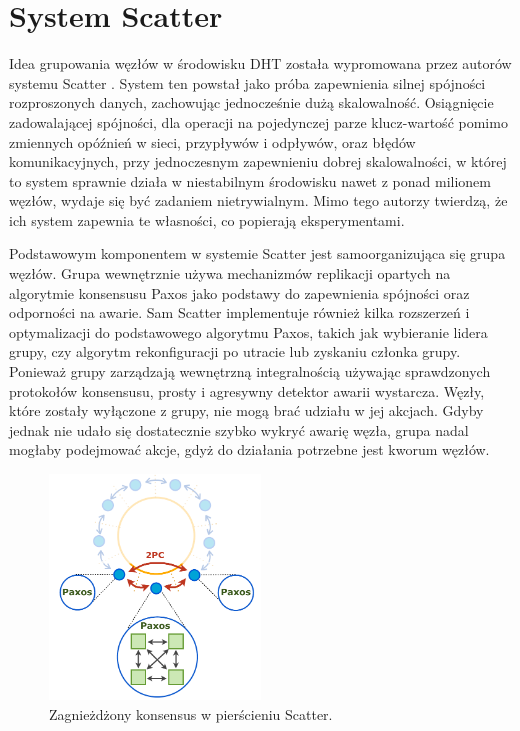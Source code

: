 \documentclass[12pt, twoside, openany]{report}
\begin{document}
\section{System Scatter}
\label{subch_scatter}
Idea grupowania węzłów w środowisku DHT została wypromowana przez autorów systemu Scatter \cite{bib:scatter}. System ten powstał jako próba zapewnienia silnej spójności rozproszonych danych,
zachowując jednocześnie dużą skalowalność. Osiągnięcie zadowalającej spójności, dla operacji na pojedynczej parze klucz-wartość pomimo zmiennych opóźnień w sieci, przypływów i odpływów, oraz błędów komunikacyjnych, przy jednoczesnym zapewnieniu dobrej skalowalności, w której to system sprawnie działa w niestabilnym środowisku nawet z ponad milionem węzłów, wydaje się być zadaniem nietrywialnym. Mimo tego autorzy twierdzą, że ich system zapewnia te własności, co popierają eksperymentami.

Podstawowym komponentem w systemie Scatter jest samoorganizująca się grupa węzłów. Grupa wewnętrznie używa mechanizmów replikacji opartych na algorytmie konsensusu Paxos jako podstawy do zapewnienia spójności oraz odporności na awarie. Sam Scatter implementuje również kilka rozszerzeń i optymalizacji do podstawowego algorytmu Paxos, takich jak wybieranie lidera grupy, czy algorytm rekonfiguracji po utracie lub zyskaniu członka grupy.
Ponieważ grupy zarządzają wewnętrzną integralnością używając sprawdzonych protokołów konsensusu, prosty i agresywny detektor awarii wystarcza. Węzły, które zostały wyłączone z grupy, nie mogą brać udziału w jej akcjach. Gdyby jednak nie udało się dostatecznie szybko wykryć awarię węzła, grupa nadal mogłaby podejmować akcje, gdyż do działania potrzebne jest kworum węzłów.

\begin{figure}[H]
\centering
\includegraphics[width=0.5\textwidth,height=\textheight,keepaspectratio]{scatter.png}
\caption{Zagnieżdżony konsensus w pierścieniu Scatter.}
\label{fig:scatter}
\end{figure}
\end{document}

